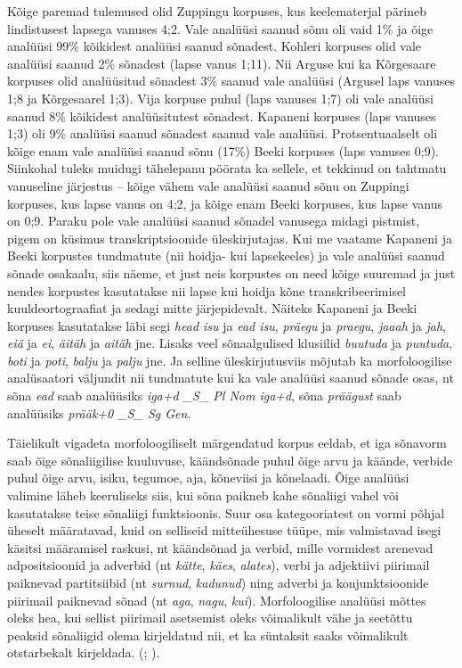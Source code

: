 \documentclass[12pt]{article}
\begin{document}
Kõige paremad tulemused olid Zuppingu korpuses, kus keelematerjal pärineb lindistusest lapsega vanuses 4;2. Vale analüüsi saanud sõnu oli vaid 1\% ja õige analüüsi 99\% kõikidest analüüsi saanud sõnadest. Kohleri korpuses olid vale analüüsi saanud 2\% sõnadest (lapse vanus 1;11). Nii Arguse kui ka Kõrgesaare korpuses olid analüüsitud sõnadest 3\% saanud vale analüüsi (Argusel laps vanuses 1;8 ja Kõrgesaarel 1;3). Vija korpuse puhul (laps vanuses 1;7) oli vale analüüsi saanud 8\% kõikidest analüüsitutest sõnadest. Kapaneni korpuses (laps vanuses 1;3) oli 9\% analüüsi saanud sõnadest saanud vale analüüsi. Protsentuaalselt oli kõige enam vale analüüsi saanud sõnu (17\%) Beeki korpuses (laps vanuses 0;9). Siinkohal tuleks muidugi tähelepanu pöörata ka sellele, et tekkinud on tahtmatu vanuseline järjestus -- kõige vähem vale analüüsi saanud sõnu on Zuppingi korpuses, kus lapse vanus on 4;2, ja kõige enam Beeki korpuses, kus lapse vanus on 0;9. Paraku pole vale analüüsi saanud sõnadel vanusega midagi pistmist, pigem on küsimus transkriptsioonide üleskirjutajas. Kui me vaatame Kapaneni ja Beeki korpustes tundmatute (nii hoidja- kui lapsekeeles) ja vale analüüsi saanud sõnade osakaalu, siis näeme, et just neis korpustes on need kõige suuremad ja just nendes korpustes kasutatakse nii lapse kui hoidja kõne transkribeerimisel kuuldeortograafiat ja sedagi mitte järjepidevalt. Näiteks Kapaneni ja Beeki korpuses kasutatakse läbi segi \emph{head isu} ja \emph{ead isu}, \emph{präegu} ja \emph{praegu}, \emph{jaaah} ja \emph{jah}, \emph{eiä} ja \emph{ei}, \emph{äitäh} ja \emph{aitäh} jne. Lisaks veel sõnaalgulised klusiilid \emph{buutuda} ja \emph{puutuda}, \emph{boti} ja \emph{poti}, \emph{balju} ja \emph{palju} jne. Ja selline üleskirjutusviis mõjutab ka morfoloogilise analüsaatori väljundit nii tundmatute kui ka vale analüüsi saanud sõnade osas, nt sõna \emph{ead} saab analüüsiks 
\emph{iga+d \_S\_ Pl Nom iga+d}, sõna \emph{präägust} saab analüüsiks \emph{prääk+0 \_S\_ Sg Gen}.


Täielikult vigadeta morfoloogiliselt märgendatud korpus eeldab, et iga sõnavorm saab õige sõnaliigilise kuuluvuse, käändsõnade puhul õige arvu ja käände, verbide puhul õige arvu, isiku, tegumoe, aja, kõneviisi ja kõnelaadi. Õige analüüsi valimine läheb keeruliseks siis, kui sõna paikneb kahe sõnaliigi vahel või kasutatakse teise sõnaliigi funktsioonis. Suur osa kategooriatest on vormi põhjal üheselt määratavad, kuid on selliseid mitteühesuse tüüpe, mis valmistavad isegi käsitsi määramisel raskusi, nt käändsõnad ja verbid, mille vormidest arenevad adpositsioonid ja adverbid (nt \emph{kätte}, \emph{käes}, \emph{alates}), verbi ja adjektiivi piirimail paiknevad partitsiibid (nt \emph{surnud}, \emph{kadunud}) ning adverbi ja konjunktsioonide piirimail paiknevad sõnad (nt \emph{aga}, \emph{nagu}, \emph{kui}). Morfoloogilise analüüsi mõttes oleks hea, kui sellist piirimail asetsemist oleks võimalikult vähe ja seetõttu peaksid sõnaliigid olema kirjeldatud nii, et ka süntaksit saaks võimalikult otstarbekalt kirjeldada. (\citealp[102--104]{Sonaliik}; \citealp[627--631]{Sonaliik2}).
\end{document}

